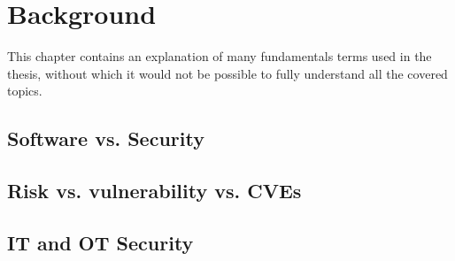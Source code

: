 \chapter{Background}
\label{cha:background}


This chapter contains an explanation of many fundamentals terms used in the thesis, without which it would not be possible to fully understand all the covered topics. 

\section{Software vs. Security}



\section{Risk vs. vulnerability vs. CVEs}



\section{IT and OT Security}



